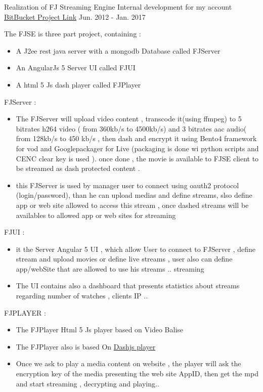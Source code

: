 \begin{cventries}
\cventry
{Realization of FJ Streaming Engine} %
{Internal development for my account } %
{ \href{https://bitbucket.org/account/user/easysoftin/projects/FJSE}{BitBucket Project Link} }%
{Jun. 2012 - Jan. 2017}  %
{ %
\begin{cvitems}
\item {The FJSE is three part project, containing :}
\begin{itemize}
\item { A J2ee rest java server  with a mongodb Database called FJServer}
\item { An AngularJs 5 Server UI called FJUI }
\item { A  html 5 Js dash player called FJPlayer}
\end{itemize}
\item {  FJServer : }
\begin{itemize}
\item{ The FJServer will upload video content ,  transcode it(using ffmpeg) to 5 bitrates h264 video ( from 360kb/s to 4500kb/s) and 3 bitrates aac audio( from 128kb/s to 450 kb/s , then dash and encrypt it using Bento4 framework for vod and Googlepackager for Live (packaging is done wi python scripts and CENC clear key  is used ). once done , the movie is available to FJSE client to be streamed as dash protected content . }
\item {this FJServer is used by manager user to connect using oauth2 protocol (login/password), than he can upload medias and define streams, slso define app or web site allowed to access this stream , once dashed streams will be availables to allowed app or web sites for streaming}
\end{itemize}
\item {FJUI :}
\begin{itemize}
\item {it the Server Angular 5 UI , which allow User  to connect to FJServer , define stream and upload movies or define live streams  , user also can define app/webSite that are allowed to use his streams ..
 streaming}
\item {The UI contains also a dashboard that presents statistics about streams regarding number of watches , clients IP ..}
\end{itemize}
\item { FJPLAYER :}
\begin{itemize}
\item {The FJPlayer Html 5 Js player based on Video Balise }
\item {The FJPlayer also is based On \href{http://dashif.org/reference/players/javascript/1.4.0/samples/dash-if-reference-player/}{Dashjs player} }
\item {Once we ask to play a media content on website , the player will ask the encryption key of the media presenting the web site AppID, then get the mpd and start streaming , decrypting  and playing..}
\end{itemize}
\end{cvitems}
}


\end{cventries}
